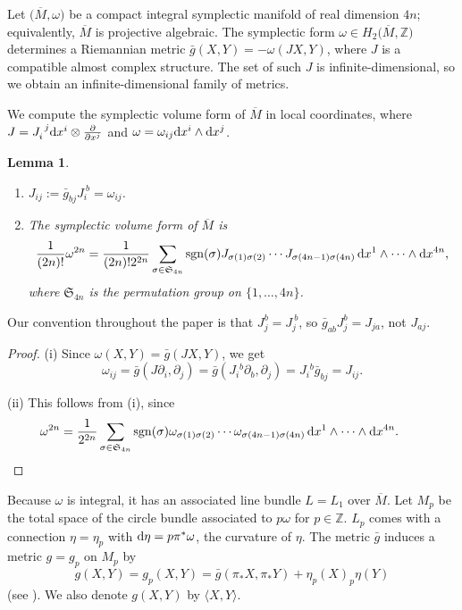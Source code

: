 \documentclass[pdftex]{sigma}
\numberwithin{equation}{section}
\newtheorem{Lemma}[Theorem]{Lemma}
\theoremstyle{definition}
\newcommand{\BbZ}{{\mathbb Z}}
\newcommand{\Z}{\BbZ}
\newcommand{\be}{\eta}
\newcommand{\bgg}{\bar g}
\newcommand{\bg}{ g}
\newcommand{\bx}{X}
\newcommand{\by}{Y}
\newcommand{\sgn}{{\rm sgn}}
\newcommand{\om}{\overline{M}}
\newcommand{\omp}{M_p}
\begin{document}
Let $\bigl(\om,\omega\bigr)$ be a compact integral symplectic manifold of real dimension $4n$;
equivalently, $\om$ is projective algebraic. The symplectic form $\omega\in H_2\bigl(\om,\Z\bigr)$ determines a Riemannian metric $\bar g(X,Y) = -\omega(JX,Y)$, where $J$ is a compatible almost complex structure. The set of such $J$ is infinite-dimensional, so we obtain an infinite-dimensional family of metrics.

We compute the symplectic volume form of $\om$ in local coordinates, where
 $J = J_{ i}^{\ j} {\rm d}x^i \otimes \frac{\partial}{\partial x^j}$
 and $\omega = \omega_{ij} {\rm d}x^i\wedge {\rm d}x^j$.

 \begin{Lemma} \label{lem:Y.one}\quad
 \begin{enumerate}\itemsep=0pt
\item[$(i)$] $J_{ij} := \bgg_{bj}J^{\ b}_{ i} = \omega_{ij}$.

\item[$(ii)$]
The symplectic volume form of $\om$ is
\[\frac{1}{(2n)!}\omega^{2n} = \frac{1}{(2n)!2^{2n}}\sum_{\sigma\in \mathfrak S_{4n}}\sgn (\sigma) J_{\sigma(1)\sigma(2)} \cdots
 J_{\sigma(4n-1)\sigma(4n)}\, {\rm d}x^1\wedge\cdots\wedge {\rm d}x^{4n},\]
where $\mathfrak S_{4n}$ is the permutation group on $\{1,\dots,4n\}$.
\end{enumerate}
\end{Lemma}

Our convention throughout the paper is that $J_j^b = J_j^{\ b}$, so $\bgg_{ab}J_j^b = J_{ja}$, not $J_{aj}$.

\begin{proof} (i) Since $\omega(X,Y) = \bgg(JX,Y)$, we get
\[\omega_{ij} = \bgg(J\partial_i, \partial_j) = \bgg(J_i{}^b\partial_b, \partial_j) = J_i{}^b \bgg_{bj} = J_{ij}.\]

(ii) This follows from (i), since
\[\omega^{2n} =\frac{1}{2^{2n}}
\sum_{\sigma\in \mathfrak S_{4n}}\sgn (\sigma) \omega_{\sigma(1)\sigma(2)} \cdots
 \omega_{\sigma(4n-1)\sigma(4n)}\, {\rm d}x^1\wedge\cdots\wedge {\rm d}x^{4n}.\tag*{\qed}\]
\renewcommand{\qed}{}
\end{proof}

Because $\omega$ is integral, it has an associated line bundle $L = L_1$ over $\om$. Let $\omp$ be the total space of the circle bundle \smash{$L_p\stackrel{\pi}{\to} \om$} associated to $p\omega$ for $p\in\Z$.
$L_p$ comes with a connection $\eta= \eta_p$ with ${\rm d}\eta = p\pi^*\omega$, the curvature of $\eta$. The metric $\bgg$ induces a metric $g=g_p$ on $\omp$ by
\begin{equation}\label{eq:gp}\bg(\bx,\by)= \bg_p(X,Y) = \bar g(\pi_*\bx, \pi_*\by) + \be_p(\bx)_p\be(\by)
\end{equation}
(see \cite[p.~37]{Blair}).
We also denote $\bg(\bx,\by)$ by $\langle \bx, \by\rangle$.
\end{document}
